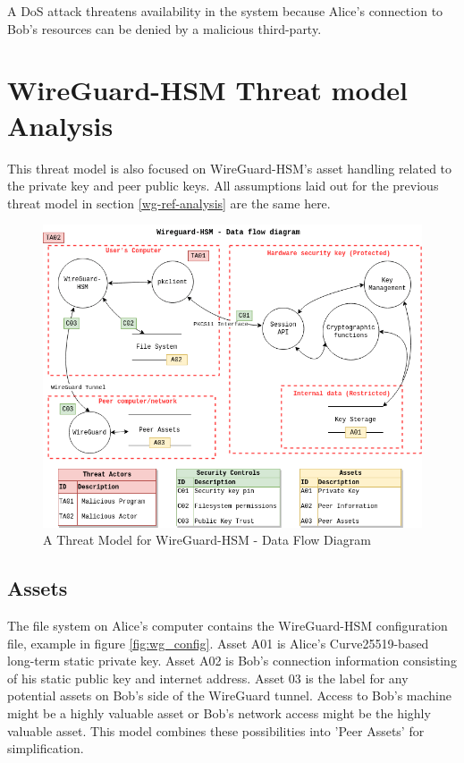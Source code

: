 \documentclass [11pt, proquest] {uwthesis}[2020/02/24]
\begin{document}
A DoS attack threatens availability in the system because Alice's connection to Bob's resources can be denied by a malicious third-party.

\section{WireGuard-HSM Threat model Analysis}
\label{wg-hsm-analysis}
This threat model is also focused on WireGuard-HSM's asset handling related to the private key and peer public keys. All assumptions laid out for the previous threat model in section \ref{wg-ref-analysis} are the same here.

\begin{figure}[ht]
\includegraphics[width=14cm]{paper/images/WGHSM_DFD.drawio.png}
\caption{A Threat Model for WireGuard-HSM - Data Flow Diagram}
\label{fig:wg_hsm_dfd}
\end{figure}

\subsection{Assets}
The file system on Alice's computer contains the WireGuard-HSM configuration file, example in figure \ref{fig:wg_config}. 
Asset A01 is Alice's Curve25519-based long-term static private key. Asset A02 is Bob's connection information consisting of his static public key and internet address.
Asset 03 is the label for any potential assets on Bob's side of the WireGuard tunnel. Access to Bob's machine might be a highly valuable asset or Bob's network access might be the highly valuable asset. This model combines these possibilities into 'Peer Assets' for simplification.
\end{document}
